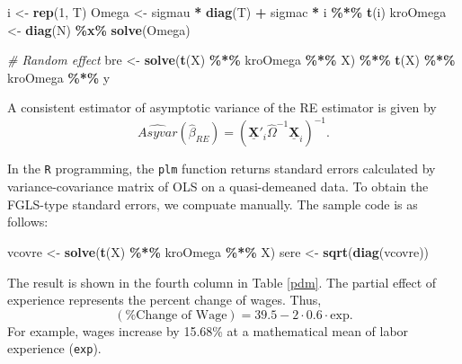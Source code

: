 \documentclass[
  12pt,
]{article}
\newenvironment{Shaded}{\begin{snugshade}}{\end{snugshade}}
\newcommand{\CommentTok}[1]{\textcolor[rgb]{0.56,0.35,0.01}{\textit{#1}}}
\newcommand{\DecValTok}[1]{\textcolor[rgb]{0.00,0.00,0.81}{#1}}
\newcommand{\KeywordTok}[1]{\textcolor[rgb]{0.13,0.29,0.53}{\textbf{#1}}}
\newcommand{\NormalTok}[1]{#1}
\newcommand{\OperatorTok}[1]{\textcolor[rgb]{0.81,0.36,0.00}{\textbf{#1}}}
\newcommand{\StringTok}[1]{\textcolor[rgb]{0.31,0.60,0.02}{#1}}
\begin{document}
\begin{Shaded}
\begin{Highlighting}[]
\NormalTok{i \textless{}{-}}\StringTok{ }\KeywordTok{rep}\NormalTok{(}\DecValTok{1}\NormalTok{, T)}
\NormalTok{Omega \textless{}{-}}\StringTok{ }\NormalTok{sigmau }\OperatorTok{*}\StringTok{ }\KeywordTok{diag}\NormalTok{(T) }\OperatorTok{+}\StringTok{ }\NormalTok{sigmac }\OperatorTok{*}\StringTok{ }\NormalTok{i }\OperatorTok{\%*\%}\StringTok{ }\KeywordTok{t}\NormalTok{(i)}
\NormalTok{kroOmega \textless{}{-}}\StringTok{ }\KeywordTok{diag}\NormalTok{(N) }\OperatorTok{\%x\%}\StringTok{ }\KeywordTok{solve}\NormalTok{(Omega)}

\CommentTok{\# Random effect}
\NormalTok{bre \textless{}{-}}\StringTok{ }\KeywordTok{solve}\NormalTok{(}\KeywordTok{t}\NormalTok{(X) }\OperatorTok{\%*\%}\StringTok{ }\NormalTok{kroOmega }\OperatorTok{\%*\%}\StringTok{ }\NormalTok{X) }\OperatorTok{\%*\%}\StringTok{ }\KeywordTok{t}\NormalTok{(X) }\OperatorTok{\%*\%}\StringTok{ }\NormalTok{kroOmega }\OperatorTok{\%*\%}\StringTok{ }\NormalTok{y}
\end{Highlighting}
\end{Shaded}

A consistent estimator of asymptotic variance of the RE estimator is
given by \[
  \widehat{Asyvar}(\hat{\beta}_{RE}) = 
  \left( \underline{\mathbf{X}}'_i \hat{\Omega}^{-1} \underline{\mathbf{X}}_i \right)^{-1}.
\]

In the \texttt{R} programming, the \texttt{plm} function returns
standard errors calculated by variance-covariance matrix of OLS on a
quasi-demeaned data. To obtain the FGLS-type standard errors, we
compuate manually. The sample code is as follows:

\begin{Shaded}
\begin{Highlighting}[]
\NormalTok{vcovre \textless{}{-}}\StringTok{ }\KeywordTok{solve}\NormalTok{(}\KeywordTok{t}\NormalTok{(X) }\OperatorTok{\%*\%}\StringTok{ }\NormalTok{kroOmega }\OperatorTok{\%*\%}\StringTok{ }\NormalTok{X)}
\NormalTok{sere \textless{}{-}}\StringTok{ }\KeywordTok{sqrt}\NormalTok{(}\KeywordTok{diag}\NormalTok{(vcovre))}
\end{Highlighting}
\end{Shaded}

The result is shown in the fourth column in Table \ref{pdm}. The partial
effect of experience represents the percent change of wages. Thus, \[
  (\text{\% Change of Wage}) = 39.5 - 2 \cdot 0.6 \cdot \text{exp}.
\] For example, wages increase by 15.68\% at a mathematical mean of
labor experience (\texttt{exp}).
\end{document}
